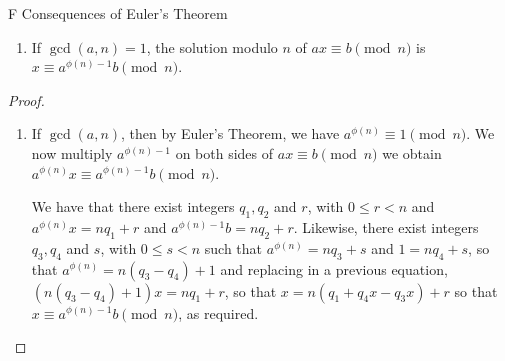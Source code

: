\begin{exercise}{F Consequences of Euler's Theorem}
\begin{enumerate}
    \item If $\gcd(a,n)=1$, the solution modulo $n$ of $ax\equiv b\pmod{n}$ is $x\equiv a^{\phi(n)-1}b\pmod{n}$.
\end{enumerate}
\end{exercise}
\begin{proof}
\begin{enumerate}
    \item If $\gcd(a,n)$, then by Euler's Theorem, we have $a^{\phi(n)}\equiv 1\pmod{n}$. We now multiply $a^{\phi(n)-1}$ on both sides of $ax\equiv b\pmod{n}$ we obtain $a^{\phi(n)}x\equiv a^{\phi(n)-1}b\pmod{n}$.

    We have that there exist integers $q_{1}, q_{2}$ and $r$, with $0\leq r<n$ and ${a^{\phi(n)}x=nq_{1}+r}$ and $a^{\phi(n)-1}b=nq_{2}+r$. Likewise, there exist integers $q_{3}, q_{4}$ and $s$, with $0\leq s<n$ such that $a^{\phi(n)}=nq_{3}+s$ and $1=nq_{4}+s$, so that $a^{\phi(n)}=n(q_{3}-q_{4})+1$ and replacing in a previous equation, $(n(q_{3}-q_{4})+1)x=nq_{1}+r$, so that $x=n(q_{1}+q_{4}x-q_{3}x)+r$ so that $x\equiv a^{\phi(n)-1}b\pmod{n}$, as required.
\end{enumerate}
\end{proof}

